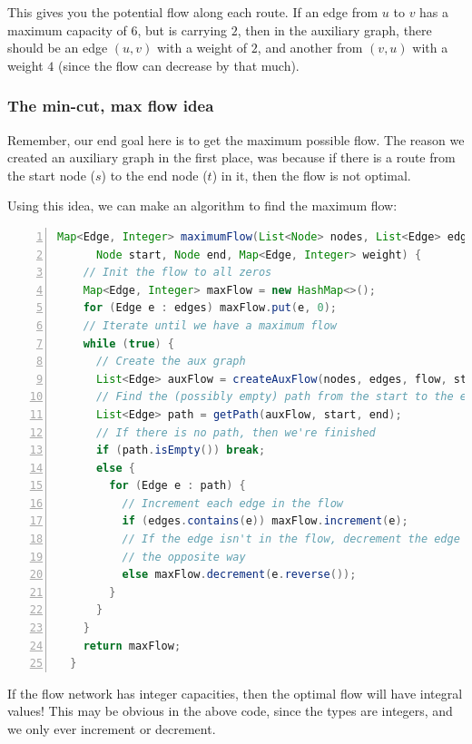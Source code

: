 This gives you the potential flow along each route. If an edge from $u$ to $v$
has a maximum capacity of $6$, but is carrying $2$, then in the auxiliary graph,
there should be an edge $(u,v)$ with a weight of $2$, and another from $(v,u)$
with a weight $4$ (since the flow can decrease by that much).


\subsubsection{The min-cut, max flow idea}

Remember, our end goal here is to get the maximum possible flow. The reason we
created an auxiliary graph in the first place, was because if there is a route
from the start node ($s$) to the end node ($t$) in it, then the flow is not
optimal.

Using this idea, we can make an algorithm to find the maximum flow:


\begin{lstlisting}[numbers=left,language=Java]
  Map<Edge, Integer> maximumFlow(List<Node> nodes, List<Edge> edges,
      Node start, Node end, Map<Edge, Integer> weight) {
    // Init the flow to all zeros
    Map<Edge, Integer> maxFlow = new HashMap<>();
    for (Edge e : edges) maxFlow.put(e, 0);
    // Iterate until we have a maximum flow
    while (true) {
      // Create the aux graph
      List<Edge> auxFlow = createAuxFlow(nodes, edges, flow, start, end);
      // Find the (possibly empty) path from the start to the end
      List<Edge> path = getPath(auxFlow, start, end);
      // If there is no path, then we're finished
      if (path.isEmpty()) break;
      else {
        for (Edge e : path) {
          // Increment each edge in the flow
          if (edges.contains(e)) maxFlow.increment(e);
          // If the edge isn't in the flow, decrement the edge going
          // the opposite way
          else maxFlow.decrement(e.reverse());
        }
      }
    }
    return maxFlow;
  }
\end{lstlisting}

If the flow network has integer capacities, then the optimal flow will have
integral values! This may be obvious in the above code, since the types are
integers, and we only ever increment or decrement.

